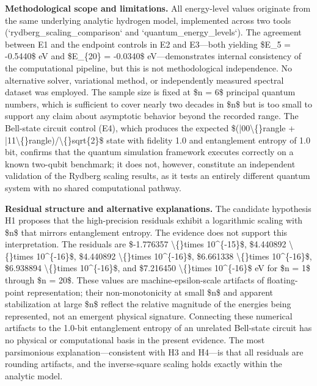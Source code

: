 \documentclass[11pt,a4paper]{article}
\begin{document}
\textbf{Methodological scope and limitations.} All energy-level values originate from the same underlying analytic hydrogen model, implemented across two tools (`rydberg\_scaling\_comparison` and `quantum\_energy\_levels`). The agreement between E1 and the endpoint controls in E2 and E3—both yielding \$E\_5 = -0.5440\$ eV and \$E\_\{20\} = -0.0340\$ eV—demonstrates internal consistency of the computational pipeline, but this is not methodological independence. No alternative solver, variational method, or independently measured spectral dataset was employed. The sample size is fixed at \$n = 6\$ principal quantum numbers, which is sufficient to cover nearly two decades in \$n\$ but is too small to support any claim about asymptotic behavior beyond the recorded range. The Bell-state circuit control (E4), which produces the expected \$(|00\textbackslash\{\}rangle + |11\textbackslash\{\}rangle)/\textbackslash\{\}sqrt\{2\}\$ state with fidelity 1.0 and entanglement entropy of 1.0 bit, confirms that the quantum simulation framework executes correctly on a known two-qubit benchmark; it does not, however, constitute an independent validation of the Rydberg scaling results, as it tests an entirely different quantum system with no shared computational pathway.

\textbf{Residual structure and alternative explanations.} The candidate hypothesis H1 proposes that the high-precision residuals exhibit a logarithmic scaling with \$n\$ that mirrors entanglement entropy. The evidence does not support this interpretation. The residuals are \$-1.776357 \textbackslash\{\}times 10\textasciicircum{}\{-15\}\$, \$4.440892 \textbackslash\{\}times 10\textasciicircum{}\{-16\}\$, \$4.440892 \textbackslash\{\}times 10\textasciicircum{}\{-16\}\$, \$6.661338 \textbackslash\{\}times 10\textasciicircum{}\{-16\}\$, \$6.938894 \textbackslash\{\}times 10\textasciicircum{}\{-16\}\$, and \$7.216450 \textbackslash\{\}times 10\textasciicircum{}\{-16\}\$ eV for \$n = 1\$ through \$n = 20\$. These values are machine-epsilon-scale artifacts of floating-point representation; their non-monotonicity at small \$n\$ and apparent stabilization at large \$n\$ reflect the relative magnitude of the energies being represented, not an emergent physical signature. Connecting these numerical artifacts to the 1.0-bit entanglement entropy of an unrelated Bell-state circuit has no physical or computational basis in the present evidence. The most parsimonious explanation—consistent with H3 and H4—is that all residuals are rounding artifacts, and the inverse-square scaling holds exactly within the analytic model.
\end{document}
